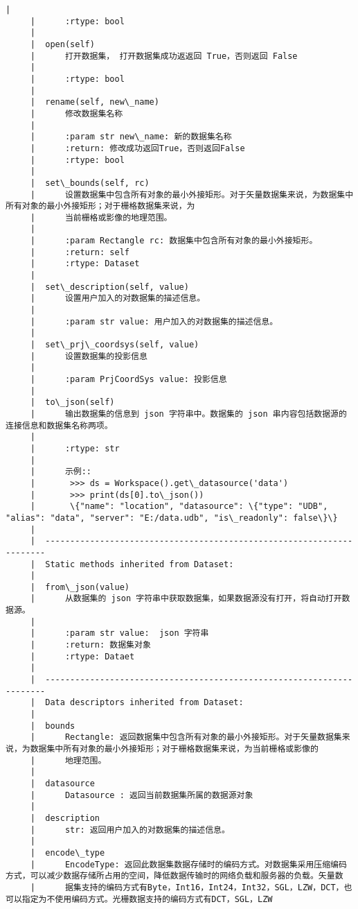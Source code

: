 \documentclass[11pt]{article}
\begin{document}
\begin{Verbatim}[commandchars=\\\{\}]
     |      
     |      :rtype: bool
     |  
     |  open(self)
     |      打开数据集， 打开数据集成功返返回 True，否则返回 False
     |      
     |      :rtype: bool
     |  
     |  rename(self, new\_name)
     |      修改数据集名称
     |      
     |      :param str new\_name: 新的数据集名称
     |      :return: 修改成功返回True，否则返回False
     |      :rtype: bool
     |  
     |  set\_bounds(self, rc)
     |      设置数据集中包含所有对象的最小外接矩形。对于矢量数据集来说，为数据集中所有对象的最小外接矩形；对于栅格数据集来说，为
     |      当前栅格或影像的地理范围。
     |      
     |      :param Rectangle rc: 数据集中包含所有对象的最小外接矩形。
     |      :return: self
     |      :rtype: Dataset
     |  
     |  set\_description(self, value)
     |      设置用户加入的对数据集的描述信息。
     |      
     |      :param str value: 用户加入的对数据集的描述信息。
     |  
     |  set\_prj\_coordsys(self, value)
     |      设置数据集的投影信息
     |      
     |      :param PrjCoordSys value: 投影信息
     |  
     |  to\_json(self)
     |      输出数据集的信息到 json 字符串中。数据集的 json 串内容包括数据源的连接信息和数据集名称两项。
     |      
     |      :rtype: str
     |      
     |      示例::
     |       >>> ds = Workspace().get\_datasource('data')
     |       >>> print(ds[0].to\_json())
     |       \{"name": "location", "datasource": \{"type": "UDB", "alias": "data", "server": "E:/data.udb", "is\_readonly": false\}\}
     |  
     |  ----------------------------------------------------------------------
     |  Static methods inherited from Dataset:
     |  
     |  from\_json(value)
     |      从数据集的 json 字符串中获取数据集，如果数据源没有打开，将自动打开数据源。
     |      
     |      :param str value:  json 字符串
     |      :return: 数据集对象
     |      :rtype: Dataet
     |  
     |  ----------------------------------------------------------------------
     |  Data descriptors inherited from Dataset:
     |  
     |  bounds
     |      Rectangle: 返回数据集中包含所有对象的最小外接矩形。对于矢量数据集来说，为数据集中所有对象的最小外接矩形；对于栅格数据集来说，为当前栅格或影像的
     |      地理范围。
     |  
     |  datasource
     |      Datasource : 返回当前数据集所属的数据源对象
     |  
     |  description
     |      str: 返回用户加入的对数据集的描述信息。
     |  
     |  encode\_type
     |      EncodeType: 返回此数据集数据存储时的编码方式。对数据集采用压缩编码方式，可以减少数据存储所占用的空间，降低数据传输时的网络负载和服务器的负载。矢量数
     |      据集支持的编码方式有Byte，Int16，Int24，Int32，SGL，LZW，DCT，也可以指定为不使用编码方式。光栅数据支持的编码方式有DCT，SGL，LZW

\end{Verbatim}
\end{document}
